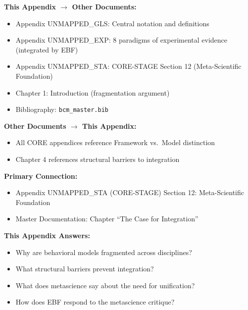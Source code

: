 \begin{tcolorbox}[colback=gray!5!white, colframe=gray!75!black,
    title=\textbf{Cross-Reference Map}]

\textbf{This Appendix $\rightarrow$ Other Documents:}
\begin{itemize}[nosep]
    \item Appendix UNMAPPED_GLS: Central notation and definitions
    \item Appendix UNMAPPED_EXP: 8 paradigms of experimental evidence (integrated by EBF)
    \item Appendix UNMAPPED_STA: CORE-STAGE Section 12 (Meta-Scientific Foundation)
    \item Chapter 1: Introduction (fragmentation argument)
    \item Bibliography: \texttt{bcm\_master.bib}
\end{itemize}

\textbf{Other Documents $\rightarrow$ This Appendix:}
\begin{itemize}[nosep]
    \item All CORE appendices reference Framework vs.\ Model distinction
    \item Chapter 4 references structural barriers to integration
\end{itemize}

\end{tcolorbox}

\begin{tcolorbox}[colback=purple!5!white, colframe=purple!75!black,
    title=Chapter Linkage]

\textbf{Primary Connection:}
\begin{itemize}[nosep]
\item Appendix UNMAPPED_STA (CORE-STAGE) Section 12: Meta-Scientific Foundation
\item Master Documentation: Chapter ``The Case for Integration''
\end{itemize}

\textbf{This Appendix Answers:}
\begin{itemize}[nosep]
\item Why are behavioral models fragmented across disciplines?
\item What structural barriers prevent integration?
\item What does metascience say about the need for unification?
\item How does EBF respond to the metascience critique?
\end{itemize}

\end{tcolorbox}

